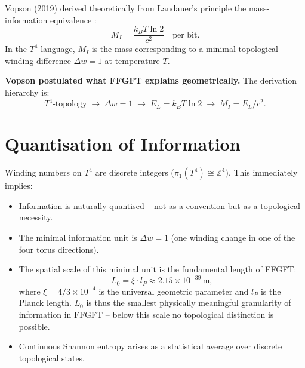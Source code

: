 Vopson (2019) derived theoretically from Landauer's principle
the mass-information equivalence \cite{Vopson2019}:
\begin{equation}
  M_I = \frac{k_B T \ln 2}{c^2} \quad \text{per bit.}
  \label{eq:vopson}
\end{equation}
In the \(T^4\) language, \(M_I\) is the mass corresponding to
a minimal topological winding difference \(\Delta w = 1\)
at temperature \(T\).

\textbf{Vopson postulated what FFGFT explains geometrically.}
The derivation hierarchy is:
\begin{equation}
  T^4\text{-topology} \;\longrightarrow\;
  \Delta w = 1 \;\longrightarrow\;
  E_L = k_B T \ln 2 \;\longrightarrow\;
  M_I = E_L / c^2.
\end{equation}

\section{Quantisation of Information}

Winding numbers on \(T^4\) are discrete integers
(\(\pi_1(T^4) \cong \mathbb{Z}^4\)).
This immediately implies:

\begin{itemize}
  \item Information is naturally quantised --
        not as a convention but as a topological necessity.
  \item The minimal information unit is \(\Delta w = 1\)
        (one winding change in one of the four torus directions).
  \item The spatial scale of this minimal unit is the
        fundamental length of FFGFT:
        \begin{equation}
          L_0 = \xi \cdot l_P \approx 2.15 \times 10^{-39}\,\text{m},
        \end{equation}
        where \(\xi = 4/3 \times 10^{-4}\) is the universal geometric
        parameter and \(l_P\) is the Planck length.
        \(L_0\) is thus the smallest physically meaningful
        granularity of information in FFGFT -- below this scale
        no topological distinction is possible.
  \item Continuous Shannon entropy arises as a statistical
        average over discrete topological states.
\end{itemize}

